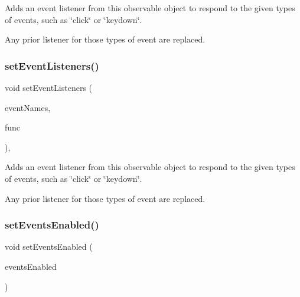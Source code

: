 Adds an event listener from this observable object to respond to the given types of events, such as \char`\"{}click\char`\"{} or \char`\"{}keydown\char`\"{}. 

Any prior listener for those types of event are replaced. \mbox{\label{classsgl_1_1GObservable_a7867184bbb686f74fae8a4db927da799}} 
\subsubsection{\texorpdfstring{set\+Event\+Listeners()}{setEventListeners()}\hspace{0.1cm}{\footnotesize\ttfamily [2/2]}}
{\footnotesize\ttfamily void set\+Event\+Listeners (\begin{DoxyParamCaption}\item[{std\+::initializer\+\_\+list$<$ std\+::string $>$}]{event\+Names,  }\item[{\mbox{\hyperlink{namespacesgl_a54427ce97bb1c2804e4fe2b0a62e8b17}{G\+Event\+Listener\+Void}}}]{func }\end{DoxyParamCaption})\hspace{0.3cm}{\ttfamily [protected]}, {\ttfamily [virtual]}}



Adds an event listener from this observable object to respond to the given types of events, such as \char`\"{}click\char`\"{} or \char`\"{}keydown\char`\"{}. 

Any prior listener for those types of event are replaced. \mbox{\label{classsgl_1_1GObservable_afaa30b2a9e0f378fd1c70d2f1d0b8216}} 
\subsubsection{\texorpdfstring{set\+Events\+Enabled()}{setEventsEnabled()}}
{\footnotesize\ttfamily void set\+Events\+Enabled (\begin{DoxyParamCaption}\item[{bool}]{events\+Enabled }\end{DoxyParamCaption})\hspace{0.3cm}{\ttfamily [virtual]}}



